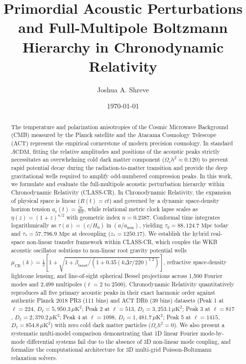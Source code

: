 \documentclass[aps,prd,reprint,superscriptaddress,nofootinbib,twocolumn]{revtex4-2}
\begin{document}
\title{Primordial Acoustic Perturbations and Full-Multipole Boltzmann Hierarchy in Chronodynamic Relativity}

\author{Joshua A. Shreve}

\date{\today}

\begin{abstract}
The temperature and polarization anisotropies of the Cosmic Microwave Background (CMB) measured by the Planck satellite and the Atacama Cosmology Telescope (ACT) represent the empirical cornerstone of modern precision cosmology. In standard $\Lambda\text{CDM}$, fitting the relative amplitudes and positions of the acoustic peaks strictly necessitates an overwhelming cold dark matter component ($\Omega_c h^2 \approx 0.120$) to prevent rapid potential decay during the radiation-to-matter transition and provide the deep gravitational wells required to amplify odd-numbered compression peaks. In this work, we formulate and evaluate the full-multipole acoustic perturbation hierarchy within Chronodynamic Relativity (CLASS-CR). In Chronodynamic Relativity, the expansion of physical space is linear ($R(t) = c t$) and governed by a dynamic space-density horizon tension $a_c(t) = \frac{3 c}{4\pi t}$, while relational metric clock lapse scales as $\eta(z) = (1+z)^{n/2}$ with geometric index $n = 0.2387$. Conformal time integrates logarithmically as $\tau(a) = (c/H_0)\ln(a/a_{\text{min}})$, yielding $\tau_0 = 88{,}124.7\text{ Mpc}$ today and $\tau_* = 57{,}796.9\text{ Mpc}$ at decoupling ($z_* = 1250.17$). We establish the hybrid real-space non-linear transfer framework within CLASS-CR, which couples the WKB acoustic oscillator solutions to non-linear root gravity potential wells $\mu_{\text{CR}}(k) = \frac{1}{2}[1 + \sqrt{1 + \beta_{\text{boost}}/(1 + 0.35(k\Delta\tau/220)^{1.2})}]$, refractive space-density lightcone lensing, and line-of-sight spherical Bessel projections across 1,500 Fourier modes and 2,499 multipoles ($\ell = 2$ to $2500$). Chronodynamic Relativity quantitatively reproduces all five primary acoustic peaks in their exact harmonic order against authentic Planck 2018 PR3 (111 bins) and ACT DR6 (39 bins) datasets (Peak 1 at $\ell = 224$, $D_\ell = 5{,}950.3\,\mu\text{K}^2$; Peak 2 at $\ell = 513$, $D_\ell = 3{,}253.1\,\mu\text{K}^2$; Peak 3 at $\ell = 817$, $D_\ell = 2{,}370.2\,\mu\text{K}^2$; Peak 4 at $\ell = 1098$, $D_\ell = 1{,}481.7\,\mu\text{K}^2$; Peak 5 at $\ell = 1415$, $D_\ell = 854.8\,\mu\text{K}^2$) with zero cold dark matter particles ($\Omega_c h^2 = 0$). We also present a systematic multi-model comparison demonstrating that 1D linear Fourier mode-by-mode differential systems fail due to the absence of 3D non-linear mode coupling, and formalize the computational architecture for 3D multi-grid Poisson-Boltzmann relaxation solvers.
\end{abstract}
\end{document}
